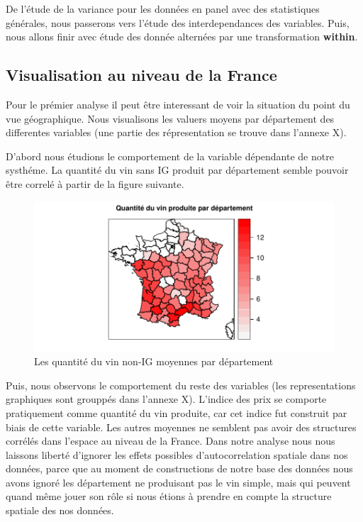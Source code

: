 \documentclass[11pt,]{article}
\begin{document}
De l'étude de la variance pour les données en panel avec des
statistiques générales, nous passerons vers l'étude des interdependances
des variables. Puis, nous allons finir avec étude des donnée alternées
par une transformation \textbf{within}.

\hypertarget{visualisation-au-niveau-de-la-france}{%
\subsection{Visualisation au niveau de la
France}\label{visualisation-au-niveau-de-la-france}}

Pour le prémier analyse il peut être interessant de voir la situation du
point du vue géographique. Nous visualisons les valuers moyens par
département des differentes variables (une partie des répresentation se
trouve dans l'annexe X).

D'abord nous étudions le comportement de la variable dépendante de notre
systhéme. La quantité du vin sans IG produit par département semble
pouvoir être correlé à partir de la figure suivante.

\FloatBarrier

\begin{figure}[!htbp]

{\centering \includegraphics{note2pres_files/figure-latex/unnamed-chunk-18-1} 

}

\caption{Les quantité du vin non-IG moyennes par département}\label{fig:unnamed-chunk-18}
\end{figure}

\FloatBarrier

Puis, nous observons le comportement du reste des variables (les
representations graphiques sont grouppés dans l'annexe X). L'indice des
prix se comporte pratiquement comme quantité du vin produite, car cet
indice fut construit par biais de cette variable. Les autres moyennes ne
semblent pas avoir des structures corrélés dans l'espace au niveau de la
France. Dans notre analyse nous nous laissons liberté d'ignorer les
effets possibles d'autocorrelation spatiale dans nos données, parce que
au moment de constructions de notre base des données nous avons ignoré
les département ne produisant pas le vin simple, mais qui peuvent quand
même jouer son rôle si nous étions à prendre en compte la structure
spatiale des nos données.
\end{document}
